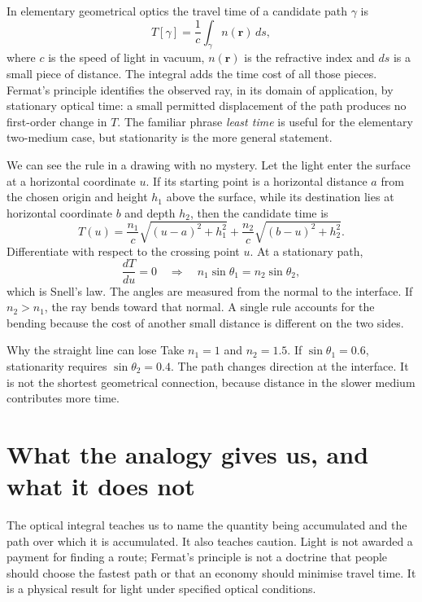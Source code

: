 In elementary geometrical optics the travel time of a candidate path $\gamma$ is
\begin{equation}
 T[\gamma]=\frac{1}{c}\int_\gamma n(\mathbf r)\,ds ,
 \label{eq:fermat-time}
\end{equation}
where $c$ is the speed of light in vacuum, $n(\mathbf r)$ is the refractive index and $ds$ is a small piece of distance. The integral adds the time cost of all those pieces. Fermat's principle identifies the observed ray, in its domain of application, by stationary optical time: a small permitted displacement of the path produces no first-order change in $T$. The familiar phrase \emph{least time} is useful for the elementary two-medium case, but stationarity is the more general statement.\cite{intro-fermat}

We can see the rule in a drawing with no mystery. Let the light enter the surface at a horizontal coordinate $u$. If its starting point is a horizontal distance $a$ from the chosen origin and height $h_1$ above the surface, while its destination lies at horizontal coordinate $b$ and depth $h_2$, then the candidate time is
\begin{equation}
 T(u)=\frac{n_1}{c}\sqrt{(u-a)^2+h_1^2}
      +\frac{n_2}{c}\sqrt{(b-u)^2+h_2^2}.
\end{equation}
Differentiate with respect to the crossing point $u$. At a stationary path,
\begin{equation}
 \frac{dT}{du}=0
 \quad\Longrightarrow\quad
 n_1\sin\theta_1=n_2\sin\theta_2 ,
\end{equation}
which is Snell's law. The angles are measured from the normal to the interface. If $n_2>n_1$, the ray bends toward that normal. A single rule accounts for the bending because the cost of another small distance is different on the two sides.

\begin{workedbox}{Why the straight line can lose}
Take $n_1=1$ and $n_2=1.5$. If $\sin\theta_1=0.6$, stationarity requires $\sin\theta_2=0.4$. The path changes direction at the interface. It is not the shortest geometrical connection, because distance in the slower medium contributes more time.
\end{workedbox}

\section{What the analogy gives us, and what it does not}
The optical integral teaches us to name the quantity being accumulated and the path over which it is accumulated. It also teaches caution. Light is not awarded a payment for finding a route; Fermat's principle is not a doctrine that people should choose the fastest path or that an economy should minimise travel time. It is a physical result for light under specified optical conditions.

